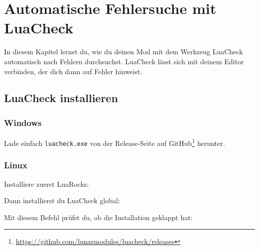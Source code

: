 \chapter{Automatische Fehlersuche mit LuaCheck}
\label{ch:quality/luacheck}

In diesem Kapitel lernst du, wie du deinen Mod mit dem Werkzeug
LuaCheck automatisch nach Fehlern durchsuchst.
LuaCheck lässt sich mit deinem Editor verbinden, der dich dann auf
Fehler hinweist.

\section{LuaCheck installieren}\label{luacheck-installieren}

\subsection{Windows}\label{windows}

Lade einfach \texttt{luacheck.\allowbreak{}exe} von der Release-Seite
auf GitHub\footnote{\url{https://github.com/lunarmodules/luacheck/releases}}
herunter.

\subsection{Linux}\label{linux}

Installiere zuerst LuaRocks:

\begin{Shaded}
\begin{Highlighting}[]
\end{Highlighting}
\end{Shaded}

Dann installierst du LuaCheck global:

\begin{Shaded}
\begin{Highlighting}[]
\end{Highlighting}
\end{Shaded}

Mit diesem Befehl prüfst du, ob die Installation geklappt hat:

\begin{Shaded}
\begin{Highlighting}[]
\end{Highlighting}
\end{Shaded}

